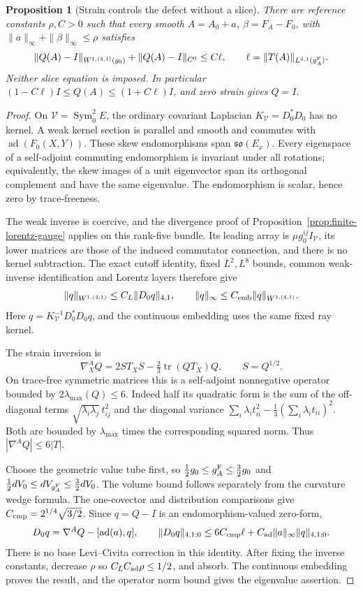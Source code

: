 \documentclass[11pt]{article}
\numberwithin{equation}{section}
\newtheorem{proposition}[theorem]{Proposition}
\theoremstyle{definition}
\theoremstyle{remark}
\DeclareMathOperator{\tr}{tr}
\DeclareMathOperator{\Sym}{Sym}
\begin{document}
\begin{proposition}[Strain controls the defect without a slice]
\label{prop:no-slice-defect}
There are reference constants \(\rho,C>0\) such that every smooth
\(A=A_0+a\), \(\beta=F_A-F_0\), with
\(\|a\|_\infty+\|\beta\|_\infty\le\rho\) satisfies
\[
 \|Q(A)-I\|_{W^{1,(4,1)}(g_0)}+\|Q(A)-I\|_{C^0}
       \le C\ell,\qquad
 \ell=\|T(A)\|_{L^{4,1}(g_A^{\rm F})}.
\]
Neither slice equation is imposed. In particular
\((1-C\ell)I\le Q(A)\le(1+C\ell)I\), and zero strain gives \(Q=I\).
\end{proposition}
\begin{proof}
On \(\mathcal V=\Sym^2_0 E\), the ordinary covariant
Laplacian \(K_{\mathcal V}=D_0^*D_0\) has no kernel.
A weak kernel section is parallel and smooth and commutes
with \(\operatorname{ad}(F_0(X,Y))\).
These skew endomorphisms span \(\mathfrak{so}(E_x)\).
Every eigenspace of a self-adjoint commuting endomorphism
is invariant under all rotations; equivalently, the skew
images of a unit eigenvector span its orthogonal complement
and have the same eigenvalue. The endomorphism is scalar,
hence zero by trace-freeness.

The weak inverse is coercive, and the divergence proof of
Proposition~\ref{prop:finite-lorentz-gauge} applies on this
rank-five bundle. Its leading array is
\(\mu g_0^{ij}I_{\mathcal V}\), its lower matrices are those
of the induced commutator connection, and there is no kernel
subtraction. The exact cutoff identity, fixed \(L^2,L^8\)
bounds, common weak-inverse identification and Lorentz layers
therefore give
\[
 \|q\|_{W^{1,(4,1)}}\le C_L\|D_0q\|_{4,1},\qquad
 \|q\|_\infty\le C_{\rm emb}\|q\|_{W^{1,(4,1)}} .
\]
Here \(q=K_{\mathcal V}^{-1}D_0^*D_0q\), and the
continuous embedding uses the same fixed ray kernel.

The strain inversion is
\[
 \nabla_X^A Q=2S T_X S-\tfrac23\tr(QT_X)Q,\qquad S=Q^{1/2}.
\]
On trace-free symmetric matrices this is a self-adjoint
nonnegative operator bounded by \(2\lambda_{\max}(Q)\le6\).
Indeed half its quadratic form is the sum of the
off-diagonal terms \(\sqrt{\lambda_i\lambda_j}\,t_{ij}^2\)
and the diagonal variance
\(\sum_i\lambda_i t_{ii}^2-\tfrac13(\sum_i\lambda_i t_{ii})^2\).
Both are bounded by \(\lambda_{\max}\) times the corresponding
squared norm. Thus \(|\nabla^A Q|\le6|T|\).

Choose the geometric value tube first, so
\(\tfrac12g_0\le g_A^{\rm F}\le\tfrac32g_0\) and
\(\tfrac12dV_0\le dV_{g_A^{\rm F}}\le\tfrac32dV_0\).
The volume bound follows separately from the curvature wedge
formula. The one-covector and distribution comparisons give
\(C_{\rm cmp}=2^{1/4}\sqrt{3/2}\).
Since \(q=Q-I\) is an endomorphism-valued zero-form,
\[
 D_0q=\nabla^A Q-[\operatorname{ad}(a),q],\qquad
 \|D_0q\|_{4,1;0}\le6C_{\rm cmp}\ell+
                       C_{\rm ad}\|a\|_\infty\|q\|_{4,1;0}.
\]
There is no base Levi--Civita correction in this identity.
After fixing the inverse constants, decrease \(\rho\)
so \(C_L C_{\rm ad}\rho\le1/2\), and absorb. The continuous
embedding proves the result, and the operator norm bound
gives the eigenvalue assertion.
\end{proof}
\end{document}
